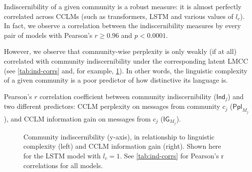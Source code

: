 \documentclass[11pt]{article}
\newcommand\Ppl{\mathsf{Ppl}}
\newcommand\IG{\mathsf{IG}}
\newcommand\Ind{\mathsf{Ind}}
\begin{document}
Indiscernibility of a given community is a robust measure: it is
almost perfectly correlated across CCLMs (such as transformers, LSTM
and various values of $l_c$).  In fact, we observe a correlation
between the indiscernibility measures by every pair of models with
Pearson's $r \geq 0.96$ and $p < 0.0001$. 

However, we observe that community-wise perplexity is only weakly (if at all) 
correlated with community indiscernibility under the corresponding latent 
LMCC (see \cref{tab:ind-corrs} and, for example, \cref{fig:cclm-lmcc-ppl}).
In other words, the linguistic complexity of a given community
is a poor predictor of how distinctive its language is.
%
\begin{table}
  \small
  \centering
  
  \caption{ Pearson's $r$ correlation coefficient between community
    indiscernibility ($\Ind_j$) and two different predictors: CCLM
    perplexity on messages from community $c_j$ ($\Ppl_{M_j}$), and
    CCLM information gain on messages from $c_j$ ($\IG_{M_j}$).  }
  \label{tab:ind-corrs}
\end{table}

\begin{figure}
  \caption{%
    Community indiscernibility (y-axis), 
    in relationship to linguistic complexity (left) and 
    CCLM information gain (right). Shown here for the LSTM
    model with $l_c=1$. See \cref{tab:ind-corrs} for 
    Pearson's r correlations for all models.
  }
  \label{fig:cclm-lmcc-ppl}
\end{figure}
\end{document}
